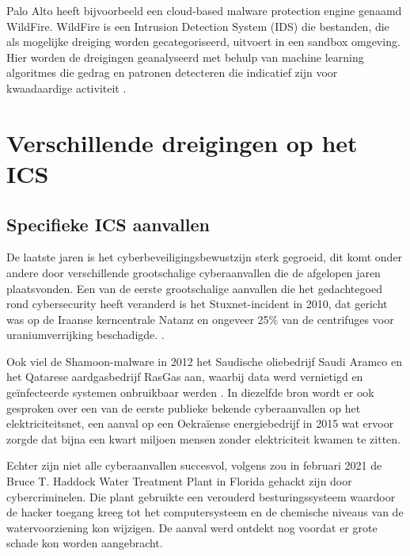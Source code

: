 \vspace{5mm}
Palo Alto heeft bijvoorbeeld een cloud-based malware protection engine genaamd WildFire. WildFire is een Intrusion Detection System (IDS) die bestanden, die als mogelijke dreiging worden gecategoriseerd, uitvoert in een sandbox omgeving. Hier worden de dreigingen geanalyseerd met behulp van machine learning algoritmes die gedrag en patronen detecteren die indicatief zijn voor kwaadaardige activiteit \autocite{PaloAltoWF2024}.




\section{Verschillende dreigingen op het ICS}

\subsection{Specifieke ICS aanvallen}

De laatste jaren is het cyberbeveiligingsbewustzijn sterk gegroeid, dit komt onder andere door verschillende grootschalige cyberaanvallen die de afgelopen jaren plaatsvonden. Een van de eerste grootschalige aanvallen die het gedachtegoed rond cybersecurity heeft veranderd is het Stuxnet-incident in 2010, dat gericht was op de Iraanse kerncentrale Natanz en ongeveer 25\% van de centrifuges voor uraniumverrijking beschadigde. \autocite{Zetter2014}. 

\vspace{5mm}
Ook viel de Shamoon-malware in 2012 het Saudische oliebedrijf Saudi Aramco en het Qatarese aardgasbedrijf RasGas aan, waarbij data werd vernietigd en geïnfecteerde systemen onbruikbaar werden \autocite{Hemsley2018}.
In diezelfde bron wordt er ook gesproken over een van de eerste publieke bekende cyberaanvallen op het elektriciteitsnet, een aanval op een Oekraïense energiebedrijf in 2015 wat ervoor zorgde dat bijna een kwart miljoen mensen zonder elektriciteit kwamen te zitten.

\vspace{5mm}
Echter zijn niet alle cyberaanvallen succesvol, volgens \textcite{Margolin2021} zou in februari 2021 de Bruce T. Haddock Water Treatment Plant in Florida gehackt zijn door cybercriminelen. Die plant gebruikte een verouderd besturingssysteem waardoor de hacker toegang kreeg tot het computersysteem en de chemische niveaus van de watervoorziening kon wijzigen. De aanval werd ontdekt nog voordat er grote schade kon worden aangebracht.



